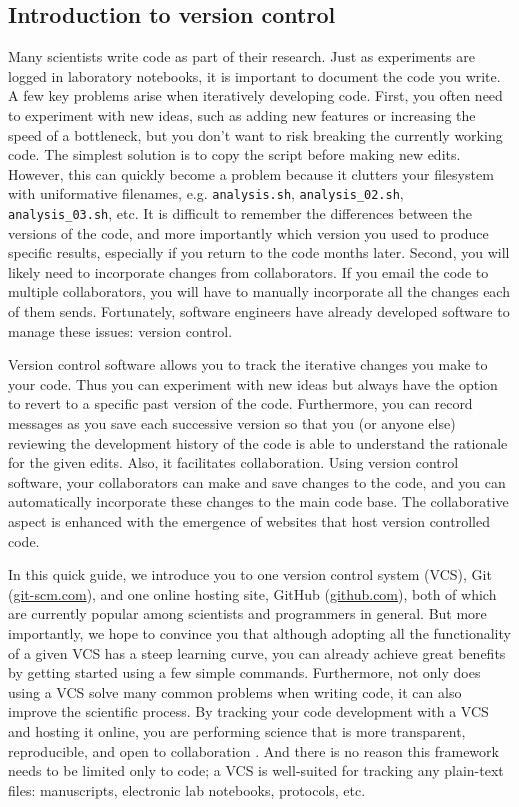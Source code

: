 \subsection{Introduction to version control}

Many scientists write code as part of their research.
Just as experiments are logged in laboratory notebooks, it is important to document the code you write.
A few key problems arise when iteratively developing code.
First, you often need to experiment with new ideas, such as adding new features or increasing the speed of a bottleneck, but you don't want to risk breaking the currently working code.
The simplest solution is to copy the script before making new edits.
However, this can quickly become a problem because it clutters your filesystem with uniformative filenames, e.g. \verb|analysis.sh|, \verb|analysis_02.sh|, \verb|analysis_03.sh|, etc.
It is difficult to remember the differences between the versions of the code, and more importantly which version you used to produce specific results, especially if you return to the code months later.
Second, you will likely need to incorporate changes from collaborators.
If you email the code to multiple collaborators, you will have to manually incorporate all the changes each of them sends.
Fortunately, software engineers have already developed software to manage these issues: version control.

Version control software allows you to track the iterative changes you make to your code.
Thus you can experiment with new ideas but always have the option to revert to a specific past version of the code.
Furthermore, you can record messages as you save each successive version so that you (or anyone else) reviewing the development history of the code is able to understand the rationale for the given edits.
Also, it facilitates collaboration.
Using version control software, your collaborators can make and save changes to the code, and you can automatically incorporate these changes to the main code base.
The collaborative aspect is enhanced with the emergence of websites that host version controlled code.

In this quick guide, we introduce you to one version control system (VCS), Git (\href{http://git-scm.com/}{git-scm.com}), and one online hosting site, GitHub (\href{https://github.com}{github.com}), both of which are currently popular among scientists and programmers in general.
But more importantly, we hope to convince you that although adopting all the functionality of a given VCS has a steep learning curve, you can already achieve great benefits by getting started using a few simple commands.
Furthermore, not only does using a VCS solve many common problems when writing code, it can also improve the scientific process.
By tracking your code development with a VCS and hosting it online, you are performing science that is more transparent, reproducible, and open to collaboration \cite{23448176}.
And there is no reason this framework needs to be limited only to code; a VCS is well-suited for tracking any plain-text files: manuscripts, electronic lab notebooks, protocols, etc.